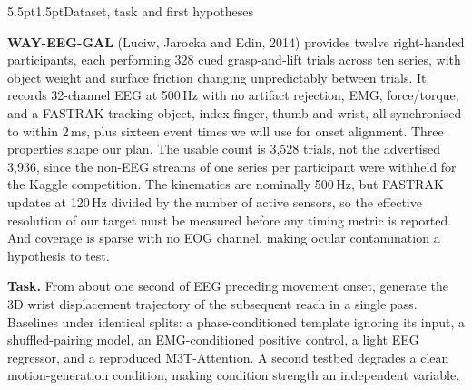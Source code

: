 \documentclass[11pt]{article}
\makeatletter
\renewcommand\section{\@startsection{section}{1}{\z@}%
  {5.5pt\@plus2pt\@minus2pt}{1.5pt}{\normalfont\large\bfseries}}
\makeatother
\begin{document}
\section{Dataset, task and first hypotheses}

\textbf{WAY-EEG-GAL} (Luciw, Jarocka and Edin, 2014) provides twelve right-handed participants, each performing 328 cued grasp-and-lift trials across ten series, with object weight and surface friction changing unpredictably between trials. It records 32-channel EEG at 500\,Hz with no artifact rejection, EMG, force/torque, and a FASTRAK tracking object, index finger, thumb and wrist, all synchronised to within 2\,ms, plus sixteen event times we will use for onset alignment. Three properties shape our plan. The usable count is 3{,}528 trials, not the advertised 3{,}936, since the non-EEG streams of one series per participant were withheld for the Kaggle competition. The kinematics are nominally 500\,Hz, but FASTRAK updates at 120\,Hz divided by the number of active sensors, so the effective resolution of our target must be measured before any timing metric is reported. And coverage is sparse with no EOG channel, making ocular contamination a hypothesis to test.

\textbf{Task.} From about one second of EEG preceding movement onset, generate the 3D wrist displacement trajectory of the subsequent reach in a single pass. Baselines under identical splits: a phase-conditioned template ignoring its input, a shuffled-pairing model, an EMG-conditioned positive control, a light EEG regressor, and a reproduced M3T-Attention. A second testbed degrades a clean motion-generation condition, making condition strength an independent variable.
\end{document}
